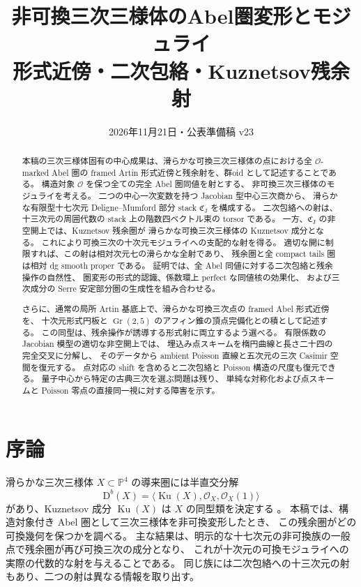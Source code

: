 \documentclass[11pt,a4paper]{ltjsarticle}
\title{非可換三次三様体のAbel圏変形とモジュライ\\\large 形式近傍・二次包絡・Kuznetsov残余射}
\author{}
\date{2026年11月21日・公表準備稿 v23}
\numberwithin{equation}{section}
\newcommand{\PP}{\mathbb P}
\begin{document}
\maketitle
\begin{abstract}
本稿の三次三様体固有の中心成果は、滑らかな可換三次三様体の点における全 $\mathcal O$-marked Abel 圏の framed Artin 形式近傍と残余射を、群oid として記述することである。
構造対象 $\mathcal O$ を保つ全ての完全 Abel 圏同値を射とする、
非可換三次三様体のモジュライを考える。
二つの中心一次変数を持つ Jacobian 型中心三次商から、
滑らかな有限型十七次元 Deligne--Mumford 部分 stack $\mathfrak C_{\mathrm J}$ を構成する。
二次包絡への射は、十三次元の周囲代数の stack 上の階数四ベクトル束の torsor である。
一方、$\mathfrak C_{\mathrm J}$ の非空開上では、Kuznetsov 残余圏が
滑らかな可換三次三様体の Kuznetsov 成分となる。
これにより可換三次の十次元モジュライへの支配的な射を得る。
適切な開に制限すれば、この射は相対次元七の滑らかな全射であり、
残余圏と全 compact tails 圏は相対 dg smooth proper である。
証明では、全 Abel 同値に対する二次包絡と残余操作の自然性、
圏変形の形式的認識、係数環上 perfect な同値核の効果化、
および三次成分の Serre 安定部分圏の生成性を組み合わせる。

さらに、通常の局所 Artin 基底上で、滑らかな可換三次点の framed Abel 形式近傍を、
十次元形式円板と $\operatorname{Gr}(2,5)$ のアフィン錐の頂点完備化との積として記述する。
この同型は、残余操作が誘導する形式射に両立するよう選べる。
有限係数の Jacobian 模型の適切な非空開上では、
埋込み点スキームを楕円曲線と長さ二十四の完全交叉に分解し、
そのデータから ambient Poisson 直線と五次元の三次 Casimir 空間を復元する。
点対応の shift を含めると二次包絡と Poisson 構造の尺度も復元できる。
量子中心から特定の古典三次を選ぶ問題は残り、
単純な対称化および点スキームと Poisson 零点の直接同一視に対する障害を示す。
\end{abstract}

\setcounter{tocdepth}{1}
\tableofcontents

\section{序論}\label{sec:intro}

滑らかな三次三様体 $X\subset\PP^4$ の導来圏には半直交分解
\[
 \mathrm D^b(X)=\langle\operatorname{Ku}(X),\mathcal O_X,\mathcal O_X(1)\rangle
\]
があり、Kuznetsov 成分 $\operatorname{Ku}(X)$ は $X$ の同型類を決定する
\cite[Theorem~1.1]{BMMSCubicTorelli}。
本稿では、構造対象付き Abel 圏として三次三様体を非可換変形したとき、
この残余圏がどの可換幾何を保つかを調べる。
主な結果は、明示的な十七次元の非可換族の一般点で残余圏が再び可換三次の成分となり、
これが十次元の可換モジュライへの実際の代数的な射を与えることである。
同じ族には二次包絡への十三次元の射もあり、二つの射は異なる情報を取り出す。
\end{document}
